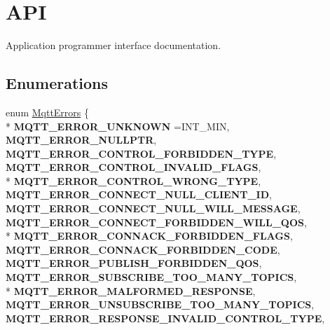 \hypertarget{group__api}{}\section{A\+PI}
\label{group__api}


Application programmer interface documentation.  


\subsection*{Enumerations}
\begin{DoxyCompactItemize}
\item 
enum \hyperlink{group__api_gabfef25ed21446904fd8b3a71cfa1f203}{Mqtt\+Errors} \{ \\*
{\bfseries M\+Q\+T\+T\+\_\+\+E\+R\+R\+O\+R\+\_\+\+U\+N\+K\+N\+O\+WN} =I\+N\+T\+\_\+\+M\+IN, 
{\bfseries M\+Q\+T\+T\+\_\+\+E\+R\+R\+O\+R\+\_\+\+N\+U\+L\+L\+P\+TR}, 
{\bfseries M\+Q\+T\+T\+\_\+\+E\+R\+R\+O\+R\+\_\+\+C\+O\+N\+T\+R\+O\+L\+\_\+\+F\+O\+R\+B\+I\+D\+D\+E\+N\+\_\+\+T\+Y\+PE}, 
{\bfseries M\+Q\+T\+T\+\_\+\+E\+R\+R\+O\+R\+\_\+\+C\+O\+N\+T\+R\+O\+L\+\_\+\+I\+N\+V\+A\+L\+I\+D\+\_\+\+F\+L\+A\+GS}, 
\\*
{\bfseries M\+Q\+T\+T\+\_\+\+E\+R\+R\+O\+R\+\_\+\+C\+O\+N\+T\+R\+O\+L\+\_\+\+W\+R\+O\+N\+G\+\_\+\+T\+Y\+PE}, 
{\bfseries M\+Q\+T\+T\+\_\+\+E\+R\+R\+O\+R\+\_\+\+C\+O\+N\+N\+E\+C\+T\+\_\+\+N\+U\+L\+L\+\_\+\+C\+L\+I\+E\+N\+T\+\_\+\+ID}, 
{\bfseries M\+Q\+T\+T\+\_\+\+E\+R\+R\+O\+R\+\_\+\+C\+O\+N\+N\+E\+C\+T\+\_\+\+N\+U\+L\+L\+\_\+\+W\+I\+L\+L\+\_\+\+M\+E\+S\+S\+A\+GE}, 
{\bfseries M\+Q\+T\+T\+\_\+\+E\+R\+R\+O\+R\+\_\+\+C\+O\+N\+N\+E\+C\+T\+\_\+\+F\+O\+R\+B\+I\+D\+D\+E\+N\+\_\+\+W\+I\+L\+L\+\_\+\+Q\+OS}, 
\\*
{\bfseries M\+Q\+T\+T\+\_\+\+E\+R\+R\+O\+R\+\_\+\+C\+O\+N\+N\+A\+C\+K\+\_\+\+F\+O\+R\+B\+I\+D\+D\+E\+N\+\_\+\+F\+L\+A\+GS}, 
{\bfseries M\+Q\+T\+T\+\_\+\+E\+R\+R\+O\+R\+\_\+\+C\+O\+N\+N\+A\+C\+K\+\_\+\+F\+O\+R\+B\+I\+D\+D\+E\+N\+\_\+\+C\+O\+DE}, 
{\bfseries M\+Q\+T\+T\+\_\+\+E\+R\+R\+O\+R\+\_\+\+P\+U\+B\+L\+I\+S\+H\+\_\+\+F\+O\+R\+B\+I\+D\+D\+E\+N\+\_\+\+Q\+OS}, 
{\bfseries M\+Q\+T\+T\+\_\+\+E\+R\+R\+O\+R\+\_\+\+S\+U\+B\+S\+C\+R\+I\+B\+E\+\_\+\+T\+O\+O\+\_\+\+M\+A\+N\+Y\+\_\+\+T\+O\+P\+I\+CS}, 
\\*
{\bfseries M\+Q\+T\+T\+\_\+\+E\+R\+R\+O\+R\+\_\+\+M\+A\+L\+F\+O\+R\+M\+E\+D\+\_\+\+R\+E\+S\+P\+O\+N\+SE}, 
{\bfseries M\+Q\+T\+T\+\_\+\+E\+R\+R\+O\+R\+\_\+\+U\+N\+S\+U\+B\+S\+C\+R\+I\+B\+E\+\_\+\+T\+O\+O\+\_\+\+M\+A\+N\+Y\+\_\+\+T\+O\+P\+I\+CS}, 
{\bfseries M\+Q\+T\+T\+\_\+\+E\+R\+R\+O\+R\+\_\+\+R\+E\+S\+P\+O\+N\+S\+E\+\_\+\+I\+N\+V\+A\+L\+I\+D\+\_\+\+C\+O\+N\+T\+R\+O\+L\+\_\+\+T\+Y\+PE}, 

\end{DoxyCompactItemize}
